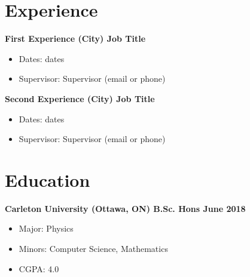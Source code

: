 \documentclass{article}
\begin{document}
{\begin{minipage}[t]{0.66\textwidth}
\section*{Experience}
\textbf{First Experience (City) \textbar{}  Job Title}
\begin{itemize}
\item Dates: dates
\item Supervisor: Supervisor (email or phone)
\end{itemize}
\textbf{Second Experience (City) \textbar{}  Job Title}
\begin{itemize}
\item Dates: dates
\item Supervisor: Supervisor (email or phone)
\end{itemize}
\section*{Education}
\textbf{Carleton University (Ottawa, ON) \textbar{} B.Sc. Hons \textbar{} June 2018}
\begin{itemize}
\item Major: Physics
\item Minors: Computer Science, Mathematics
\item CGPA: 4.0
\end{itemize}
\end{minipage}
}
\end{document}
